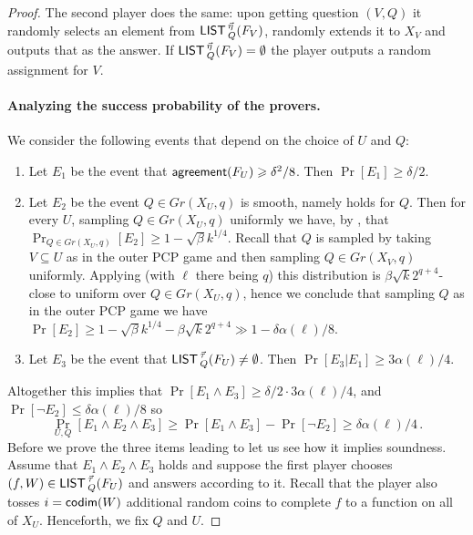 \documentclass{toc}
\newcommand\Prob[2]{{\Pr_{#1}\left[ {#2} \right]}}
\newcommand*\codimm{{\sf codim}}
\renewcommand\ge{\geqslant}
\renewcommand\le{\leqslant}
\def\M{{\sf LIST\,}}
\def\agr{{\sf agreement}}
\begin{document}
\begin{proof}
The second player does the same: upon getting question $(V,Q)$ it randomly selects an element from $\M^{\vec\eta}_Q(F_V)$, randomly extends it to $X_V$ and outputs that as the answer. If $\M^{\vec\eta}_Q(F_V)=\emptyset$ the player outputs a random assignment for $V$.



\paragraph{Analyzing the success probability of the provers.}
%
We consider the following events that depend on the choice of $U$ and $Q$:
\begin{enumerate}
\item Let $E_1$ be the event that $\agr(F_U) \ge \delta^2/8$. Then $\Pr[E_1] \ge \delta/2$.
\item Let $E_2$ be the event $Q \in Gr(X_U,q)$ is smooth, namely  holds for $Q$.
%
Then for every $U$, sampling $Q\in Gr(X_U,q)$ uniformly we have, by ,  %
that
$\Pr_{Q\in Gr(X_U,q)}[E_2] \ge 1-\sqrt{\beta} k^{1/4}$.
Recall that $Q$ is sampled by taking $V\subseteq U$ as in the outer PCP game and then sampling $Q\in Gr(X_V,q)$ uniformly.
Applying  (with $\ell$ there being $q$) this distribution is
$\beta \sqrt{k}2^{q+4}$-close to uniform over $Q\in Gr(X_U,q)$, hence we conclude that sampling
$Q$ as in the outer PCP game we have
$\Pr[E_2] \ge 1-\sqrt{\beta} k^{1/4}-\beta\sqrt{k}2^{q+4}\gg 1-\delta\alpha(\ell)/8$.

\item Let $E_3$ be the event that $\M_Q^{\vec\tau}(F_U)\neq \emptyset$. Then $\Pr[E_3|E_1] \ge 3\alpha(\ell)/4$.
\end{enumerate}
Altogether this implies that $\Pr[E_1 \wedge E_3] \ge \delta/2 \cdot 3\alpha(\ell)/4$, and
$\Pr[\neg E_2] \le \delta\alpha(\ell)/8$ so
\begin{equation}\label{eq:e123}
\Prob{U,Q}{E_1\wedge E_2\wedge E_3} \ge \Pr[E_1 \wedge E_3] - \Pr[\neg E_2] \ge \delta\alpha(\ell)/4\,.
\end{equation}
Before we prove the three items leading to  let us see
how it implies soundness.  Assume that $E_1\wedge E_2\wedge E_3$ holds
and suppose the first player chooses $(f,W)\in \M^{\vec\tau}_Q(F_U)$
and answers according to it. Recall that the player also tosses
$i=\codimm(W)$ additional random coins to complete $f$ to a function on
all of $X_U$. Henceforth, we fix $Q$ and $U$.


\end{proof}
\end{document}
